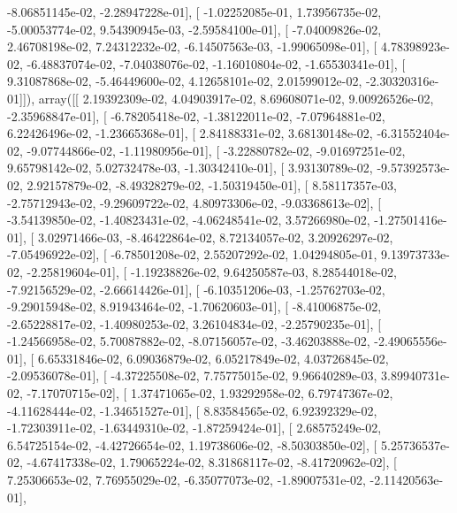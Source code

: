 \documentclass{article}
\begin{document}
         -8.06851145e-02,  -2.28947228e-01],
       [ -1.02252085e-01,   1.73956735e-02,  -5.00053774e-02,
          9.54390945e-03,  -2.59584100e-01],
       [ -7.04009826e-02,   2.46708198e-02,   7.24312232e-02,
         -6.14507563e-03,  -1.99065098e-01],
       [  4.78398923e-02,  -6.48837074e-02,  -7.04038076e-02,
         -1.16010804e-02,  -1.65530341e-01],
       [  9.31087868e-02,  -5.46449600e-02,   4.12658101e-02,
          2.01599012e-02,  -2.30320316e-01]]), array([[  2.19392309e-02,   4.04903917e-02,   8.69608071e-02,
          9.00926526e-02,  -2.35968847e-01],
       [ -6.78205418e-02,  -1.38122011e-02,  -7.07964881e-02,
          6.22426496e-02,  -1.23665368e-01],
       [  2.84188331e-02,   3.68130148e-02,  -6.31552404e-02,
         -9.07744866e-02,  -1.11980956e-01],
       [ -3.22880782e-02,  -9.01697251e-02,   9.65798142e-02,
          5.02732478e-03,  -1.30342410e-01],
       [  3.93130789e-02,  -9.57392573e-02,   2.92157879e-02,
         -8.49328279e-02,  -1.50319450e-01],
       [  8.58117357e-03,  -2.75712943e-02,  -9.29609722e-02,
          4.80973306e-02,  -9.03368613e-02],
       [ -3.54139850e-02,  -1.40823431e-02,  -4.06248541e-02,
          3.57266980e-02,  -1.27501416e-01],
       [  3.02971466e-03,  -8.46422864e-02,   8.72134057e-02,
          3.20926297e-02,  -7.05496922e-02],
       [ -6.78501208e-02,   2.55207292e-02,   1.04294805e-01,
          9.13973733e-02,  -2.25819604e-01],
       [ -1.19238826e-02,   9.64250587e-03,   8.28544018e-02,
         -7.92156529e-02,  -2.66614426e-01],
       [ -6.10351206e-03,  -1.25762703e-02,  -9.29015948e-02,
          8.91943464e-02,  -1.70620603e-01],
       [ -8.41006875e-02,  -2.65228817e-02,  -1.40980253e-02,
          3.26104834e-02,  -2.25790235e-01],
       [ -1.24566958e-02,   5.70087882e-02,  -8.07156057e-02,
         -3.46203888e-02,  -2.49065556e-01],
       [  6.65331846e-02,   6.09036879e-02,   6.05217849e-02,
          4.03726845e-02,  -2.09536078e-01],
       [ -4.37225508e-02,   7.75775015e-02,   9.96640289e-03,
          3.89940731e-02,  -7.17070715e-02],
       [  1.37471065e-02,   1.93292958e-02,   6.79747367e-02,
         -4.11628444e-02,  -1.34651527e-01],
       [  8.83584565e-02,   6.92392329e-02,  -1.72303911e-02,
         -1.63449310e-02,  -1.87259424e-01],
       [  2.68575249e-02,   6.54725154e-02,  -4.42726654e-02,
          1.19738606e-02,  -8.50303850e-02],
       [  5.25736537e-02,  -4.67417338e-02,   1.79065224e-02,
          8.31868117e-02,  -8.41720962e-02],
       [  7.25306653e-02,   7.76955029e-02,  -6.35077073e-02,
         -1.89007531e-02,  -2.11420563e-01],
\end{document}
